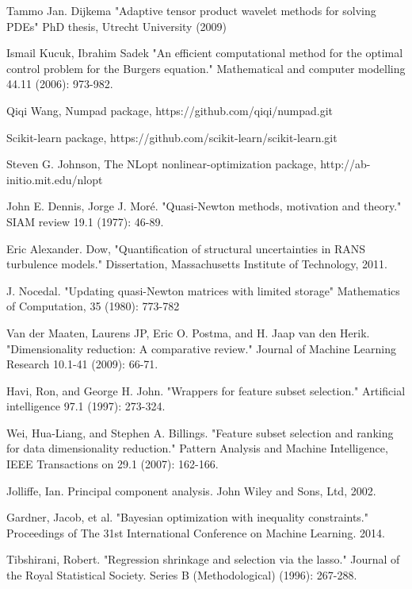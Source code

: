 \documentclass[a4paper,onecolumn]{article}
\theoremstyle{remark}
\begin{document}
\begin{thebibliography}{9}
Tammo Jan. Dijkema
"Adaptive tensor product wavelet methods for solving PDEs"
PhD thesis, Utrecht University (2009)

Ismail Kucuk,  Ibrahim Sadek
"An efficient computational method for the optimal control problem for the Burgers equation." 
Mathematical and computer modelling 44.11 (2006): 973-982.

Qiqi Wang,
Numpad package,
https://github.com/qiqi/numpad.git

Scikit-learn package,
https://github.com/scikit-learn/scikit-learn.git

Steven G. Johnson,
The NLopt nonlinear-optimization package, 
http://ab-initio.mit.edu/nlopt

John E. Dennis, Jorge J. Moré.
"Quasi-Newton methods, motivation and theory." SIAM review 19.1 (1977): 46-89.

Eric Alexander. Dow,
"Quantification of structural uncertainties in RANS turbulence models."
Dissertation, Massachusetts Institute of Technology, 2011.

J. Nocedal.
"Updating quasi-Newton matrices with limited storage"
Mathematics of Computation, 35 (1980): 773-782

Van der Maaten, Laurens JP, Eric O. Postma, and H. Jaap van den Herik. 
"Dimensionality reduction: A comparative review." 
Journal of Machine Learning Research 10.1-41 (2009): 66-71.

Havi, Ron, and George H. John. 
"Wrappers for feature subset selection."
Artificial intelligence 97.1 (1997): 273-324.

Wei, Hua-Liang, and Stephen A. Billings. 
"Feature subset selection and ranking for data dimensionality reduction." 
Pattern Analysis and Machine Intelligence, IEEE Transactions on 29.1 (2007): 162-166.

Jolliffe, Ian. Principal component analysis. John Wiley and Sons, Ltd, 2002.

Gardner, Jacob, et al. 
"Bayesian optimization with inequality constraints."
Proceedings of The 31st International Conference on Machine Learning. 2014.

Tibshirani, Robert. 
"Regression shrinkage and selection via the lasso." 
Journal of the Royal Statistical Society. Series B (Methodological) (1996): 267-288.


\end{thebibliography}
\end{document}
